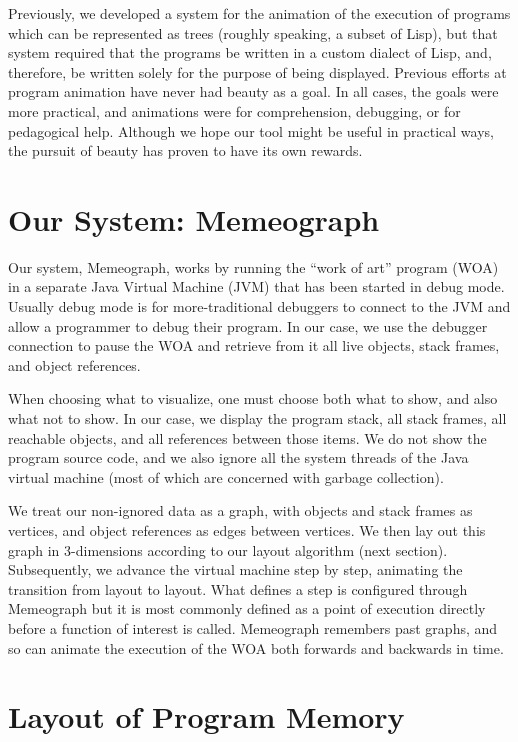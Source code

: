\documentclass[11pt]{article}
\begin{document}
Previously, we developed a system\cite{boca} for the animation of the execution
of programs which can be represented as trees (roughly speaking, a subset of
Lisp), but that system required that the programs be written in a custom
dialect of Lisp, and, therefore, be written solely for the purpose of being
displayed.  Previous efforts at program animation have never had beauty as a
goal.  In all cases, the goals were more practical, and animations were for
comprehension, debugging, or for pedagogical help.  Although we hope our tool
might be useful in practical ways, the pursuit of beauty has proven to have its
own rewards.

\section{Our System: Memeograph}

Our system, Memeograph, works by running the ``work of art'' program (WOA) in a
separate Java Virtual Machine (JVM) that has been started in debug mode.
Usually debug mode is for more-traditional debuggers to connect to the JVM and
allow a programmer to debug their program. In our case, we use the debugger
connection to pause the WOA and retrieve from it all live objects, stack
frames, and object references.

When choosing what to visualize, one must choose both what to show, and also
what not to show.  In our case, we display the program stack, all stack frames,
all reachable objects, and all references between those items.  We do not
show the program source code, and we also ignore all the system threads of the
Java virtual machine (most of which are concerned with garbage collection).

We treat our non-ignored data as a graph, with objects and stack frames as
vertices, and object references as edges between vertices.  We then lay out
this graph in 3-dimensions according to our layout algorithm (next section).
Subsequently, we advance the virtual machine step by step, animating the
transition from layout to layout. What defines a step is configured through
Memeograph but it is most commonly defined as a point of execution directly
before a function of interest is called. Memeograph remembers past graphs,
and so can animate the execution of the WOA both forwards and backwards in
time.

\section{Layout of Program Memory}
\label{sec:layout}
\end{document}
